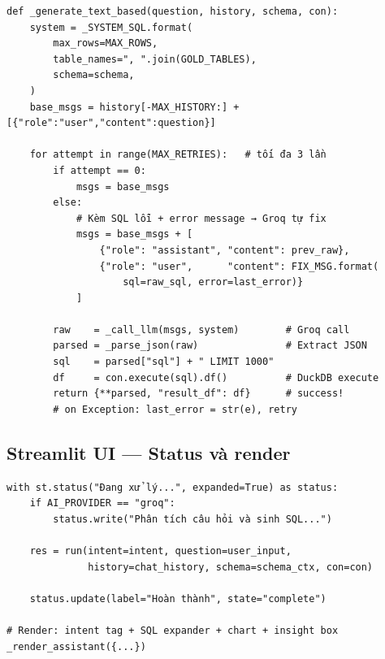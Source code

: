 \documentclass[12pt, a4paper]{article}
\begin{document}
\begin{codebox}[title={bi/agent.py — Text-based SQL + self-correction}]
\begin{verbatim}
def _generate_text_based(question, history, schema, con):
    system = _SYSTEM_SQL.format(
        max_rows=MAX_ROWS,
        table_names=", ".join(GOLD_TABLES),
        schema=schema,
    )
    base_msgs = history[-MAX_HISTORY:] + [{"role":"user","content":question}]

    for attempt in range(MAX_RETRIES):   # tối đa 3 lần
        if attempt == 0:
            msgs = base_msgs
        else:
            # Kèm SQL lỗi + error message → Groq tự fix
            msgs = base_msgs + [
                {"role": "assistant", "content": prev_raw},
                {"role": "user",      "content": FIX_MSG.format(
                    sql=raw_sql, error=last_error)}
            ]

        raw    = _call_llm(msgs, system)        # Groq call
        parsed = _parse_json(raw)               # Extract JSON
        sql    = parsed["sql"] + " LIMIT 1000"
        df     = con.execute(sql).df()          # DuckDB execute
        return {**parsed, "result_df": df}      # success!
        # on Exception: last_error = str(e), retry
\end{verbatim}
\end{codebox}

\subsection{Streamlit UI — Status và render}

\begin{codebox}[title={bi/agentic\_bi.py — Streamlit processing}]
\begin{verbatim}
with st.status("Đang xử lý...", expanded=True) as status:
    if AI_PROVIDER == "groq":
        status.write("Phân tích câu hỏi và sinh SQL...")

    res = run(intent=intent, question=user_input,
              history=chat_history, schema=schema_ctx, con=con)

    status.update(label="Hoàn thành", state="complete")

# Render: intent tag + SQL expander + chart + insight box
_render_assistant({...})
\end{verbatim}
\end{codebox}

\newpage

\end{document}
